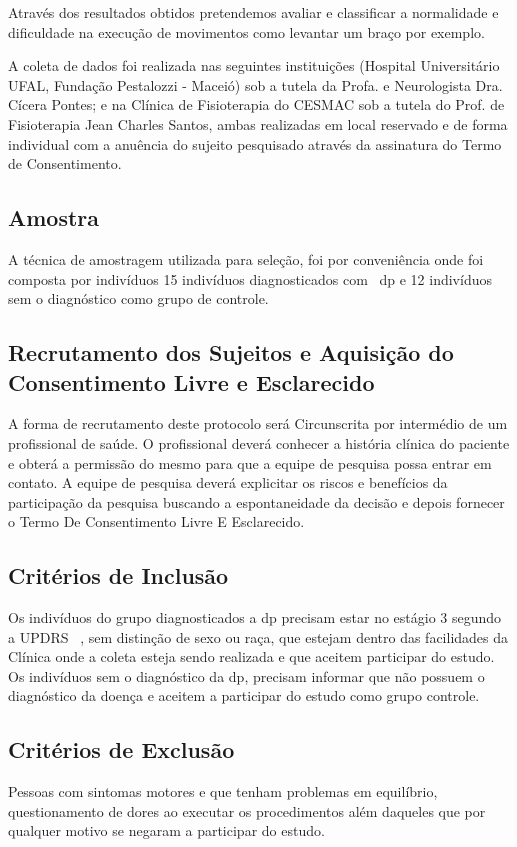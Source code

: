 Através dos resultados obtidos pretendemos avaliar e classificar a normalidade e dificuldade na execução de movimentos como levantar um braço por exemplo.

A coleta de dados foi realizada nas seguintes instituições (Hospital Universitário UFAL, Fundação Pestalozzi - Maceió) sob a tutela da Profa. e Neurologista Dra. Cícera Pontes; e na Clínica de Fisioterapia do CESMAC sob a tutela do Prof. de Fisioterapia Jean Charles Santos, ambas realizadas em local reservado e de forma individual com a anuência do sujeito pesquisado através da assinatura do Termo de Consentimento.

\subsection{Amostra}
A técnica de amostragem utilizada para seleção, foi por conveniência onde foi composta por indivíduos 15 indivíduos diagnosticados com ~\ac{dp} e 12 indivíduos sem o diagnóstico como grupo de controle. 

\subsection{Recrutamento dos Sujeitos e Aquisição do Consentimento Livre e Esclarecido}
A forma de recrutamento deste protocolo será Circunscrita por intermédio de um profissional de saúde. O profissional deverá conhecer a história clínica do paciente e obterá a permissão do mesmo para que a equipe de pesquisa possa entrar em contato.
A equipe de pesquisa deverá explicitar os riscos e benefícios da participação da pesquisa buscando a espontaneidade da decisão e depois fornecer o Termo De Consentimento Livre E Esclarecido.

\subsection{Critérios de Inclusão}
Os indivíduos do grupo diagnosticados a \ac{dp} precisam estar no estágio 3 segundo a UPDRS ~\cite{updrs87}, sem distinção de sexo ou raça, que estejam dentro das facilidades da Clínica onde a coleta esteja sendo realizada e que aceitem participar do estudo.
Os indivíduos sem o diagnóstico da \ac{dp}, precisam informar que não possuem o diagnóstico da doença e aceitem a participar do estudo como grupo controle.

\subsection{Critérios de Exclusão}
Pessoas com sintomas motores e que tenham problemas em equilíbrio, questionamento de dores ao executar os procedimentos além daqueles que por qualquer motivo se negaram a participar do estudo.


